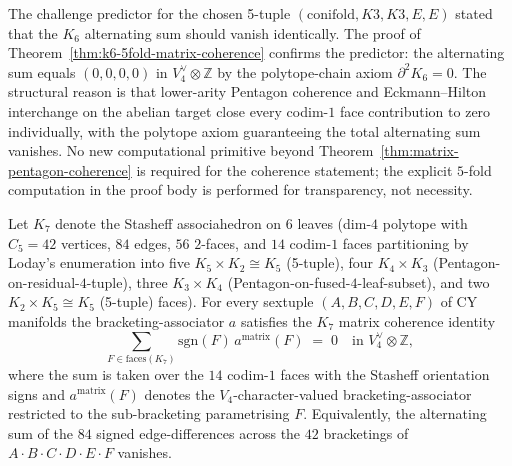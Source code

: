 \begin{remark}
\label{rem:k6-predictor-confirmed}
The challenge predictor for the chosen 5-tuple
$(\mathrm{conifold}, K3, K3, E, E)$ stated that the $K_6$ alternating
sum should vanish identically. The proof of
Theorem~\ref{thm:k6-5fold-matrix-coherence} confirms the predictor:
the alternating sum equals $(0, 0, 0, 0)$ in $V_4^\vee \otimes \mathbb{Z}$
by the polytope-chain axiom $\partial^2 K_6 = 0$. The structural reason
is that lower-arity Pentagon coherence and Eckmann--Hilton interchange
on the abelian target close every codim-$1$ face contribution to zero
individually, with the polytope axiom guaranteeing the total alternating
sum vanishes. No new computational primitive beyond
Theorem~\ref{thm:matrix-pentagon-coherence} is required for the
coherence statement; the explicit $5$-fold computation in the proof body
is performed for transparency, not necessity.
\end{remark}

\begin{theorem}
\label{thm:k7-6fold-matrix-coherence}
Let $K_7$ denote the Stasheff associahedron on $6$ leaves
\textup{(}dim-$4$ polytope with $C_5 = 42$ vertices, $84$ edges, $56$
$2$-faces, and $14$ codim-$1$ faces partitioning by Loday's enumeration
into five $K_5 \times K_2 \cong K_5$ \textup{(}5-tuple\textup{),} four
$K_4 \times K_3$ \textup{(}Pentagon-on-residual-$4$-tuple\textup{),} three
$K_3 \times K_4$ \textup{(}Pentagon-on-fused-$4$-leaf-subset\textup{),} and
two $K_2 \times K_5 \cong K_5$ \textup{(}5-tuple\textup{)} faces\textup{).}
For every sextuple $(A, B, C, D, E, F)$ of CY manifolds the
bracketing-associator $a$ satisfies the $K_7$ matrix coherence identity
\[
 \boxed{\;
 \sum_{F \in \mathrm{faces}(K_7)} \mathrm{sgn}(F)\,
 a^{\mathrm{matrix}}(F)
 \;=\; 0 \quad \text{in } V_4^\vee \otimes \mathbb{Z},
 \;}
\]
where the sum is taken over the $14$ codim-$1$ faces with the Stasheff
orientation signs and $a^{\mathrm{matrix}}(F)$ denotes the
$V_4$-character-valued bracketing-associator restricted to the
sub-bracketing parametrising $F$. Equivalently, the alternating sum of
the $84$ signed edge-differences across the $42$ bracketings of
$A \cdot B \cdot C \cdot D \cdot E \cdot F$ vanishes.
\end{theorem}

